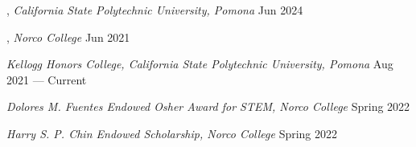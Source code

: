
, \textit{California State Polytechnic University, Pomona }	\hfill Jun 2024

, \textit{Norco College} \hfill	Jun 2021

\textit{Kellogg Honors College, California State Polytechnic University, Pomona} 	\hfill Aug 2021 --- Current

\textit{Dolores M. Fuentes Endowed Osher Award for STEM, Norco College} \hfill	Spring 2022

\textit{Harry S. P. Chin Endowed Scholarship, Norco College} \hfill	Spring 2022



